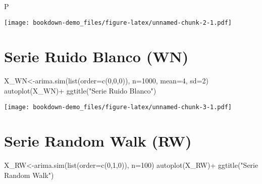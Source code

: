 \documentclass[
]{book}
\newenvironment{Shaded}{\begin{snugshade}}{\end{snugshade}}
\newcommand{\AttributeTok}[1]{\textcolor[rgb]{0.77,0.63,0.00}{#1}}
\newcommand{\DecValTok}[1]{\textcolor[rgb]{0.00,0.00,0.81}{#1}}
\newcommand{\FunctionTok}[1]{\textcolor[rgb]{0.00,0.00,0.00}{#1}}
\newcommand{\NormalTok}[1]{#1}
\newcommand{\OtherTok}[1]{\textcolor[rgb]{0.56,0.35,0.01}{#1}}
\newcommand{\SpecialCharTok}[1]{\textcolor[rgb]{0.00,0.00,0.00}{#1}}
\newcommand{\StringTok}[1]{\textcolor[rgb]{0.31,0.60,0.02}{#1}}
\begin{document}
\begin{Shaded}
\begin{Highlighting}[]
\NormalTok{P}
\end{Highlighting}
\end{Shaded}

\texttt{[image: bookdown-demo\_files/figure-latex/unnamed-chunk-2-1.pdf]}

\hypertarget{serie-ruido-blanco-wn}{%
\section{Serie Ruido Blanco (WN)}\label{serie-ruido-blanco-wn}}

\begin{Shaded}
\begin{Highlighting}[]
\NormalTok{X\_WN}\OtherTok{\textless{}{-}}\FunctionTok{arima.sim}\NormalTok{(}\FunctionTok{list}\NormalTok{(}\AttributeTok{order=}\FunctionTok{c}\NormalTok{(}\DecValTok{0}\NormalTok{,}\DecValTok{0}\NormalTok{,}\DecValTok{0}\NormalTok{)), }\AttributeTok{n=}\DecValTok{1000}\NormalTok{, }\AttributeTok{mean=}\DecValTok{4}\NormalTok{, }\AttributeTok{sd=}\DecValTok{2}\NormalTok{)}
\FunctionTok{autoplot}\NormalTok{(X\_WN)}\SpecialCharTok{+}
\FunctionTok{ggtitle}\NormalTok{(}\StringTok{"Serie Ruido Blanco"}\NormalTok{)}
\end{Highlighting}
\end{Shaded}

\texttt{[image: bookdown-demo\_files/figure-latex/unnamed-chunk-3-1.pdf]}

\hypertarget{serie-random-walk-rw}{%
\section{Serie Random Walk (RW)}\label{serie-random-walk-rw}}

\begin{Shaded}
\begin{Highlighting}[]
\NormalTok{X\_RW}\OtherTok{\textless{}{-}}\FunctionTok{arima.sim}\NormalTok{(}\FunctionTok{list}\NormalTok{(}\AttributeTok{order=}\FunctionTok{c}\NormalTok{(}\DecValTok{0}\NormalTok{,}\DecValTok{1}\NormalTok{,}\DecValTok{0}\NormalTok{)), }\AttributeTok{n=}\DecValTok{100}\NormalTok{)}
\FunctionTok{autoplot}\NormalTok{(X\_RW)}\SpecialCharTok{+}
\FunctionTok{ggtitle}\NormalTok{(}\StringTok{"Serie Random Walk"}\NormalTok{)}
\end{Highlighting}
\end{Shaded}
\end{document}
